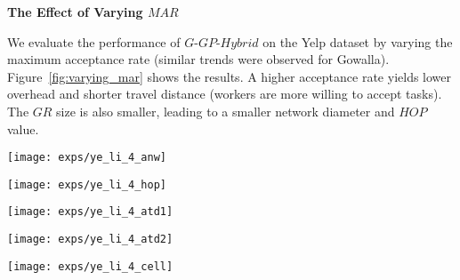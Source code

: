 \documentclass{USC-Thesis}
\numberwithin{equation}{chapter}
\begin{document}
\textbf{The Effect of Varying $\mathit{MAR}$}

We evaluate the performance of $G$-$\mathit{GP}$-$\mathit{Hybrid}$ on the Yelp dataset by varying the maximum acceptance rate (similar trends were observed for Gowalla). Figure~\ref{fig:varying_mar} shows the results.
A higher acceptance rate yields lower overhead and shorter travel distance (workers are more willing to accept tasks). The $\mathit{GR}$ size is also smaller, leading to a smaller network diameter and $\mathit{HOP}$ value.


\begin{figure*}[tbh]
	\begin{minipage}[b]{0.195\linewidth}
	\centering
		\texttt{[image: exps/ye\_li\_4\_anw]}
		\label{fig:ye_li_4_anw}
	\end{minipage}
	\begin{minipage}[b]{0.195\linewidth}
	\centering
		\texttt{[image: exps/ye\_li\_4\_hop]}
		\label{fig:ye_li_4_hop}
	\end{minipage}
	\begin{minipage}[b]{0.195\linewidth}
	\centering
		\texttt{[image: exps/ye\_li\_4\_atd1]}
		\label{fig:ye_li_4_atd1}
	\end{minipage}	
	\begin{minipage}[b]{0.195\linewidth}
	\centering
		\texttt{[image: exps/ye\_li\_4\_atd2]}
		\label{fig:ye_li_4_atd2}
	\end{minipage}
	\begin{minipage}[b]{0.195\linewidth}
		\centering
		\texttt{[image: exps/ye\_li\_4\_cell]}
		\label{fig:ye_li_4_cell}
	\end{minipage}
	\caption{Performance of geocast algorithm ($G$-$\mathit{GP}$-$\mathit{Hybrid}$) when varying Acceptance Rate (Ye.-Linear).}
\label{fig:varying_mar}
\end{figure*}
\end{document}
